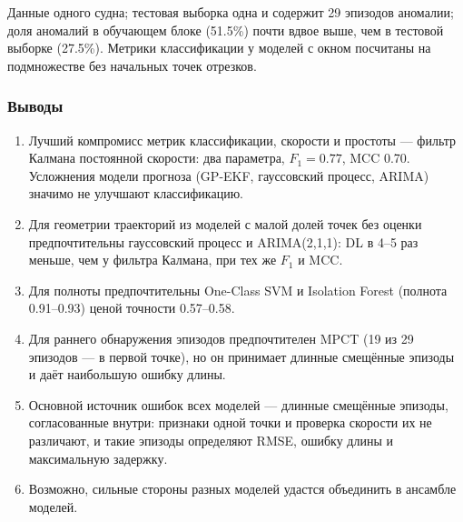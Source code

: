 \documentclass[a4paper,12pt]{report}
\begin{document}
Данные одного судна; тестовая выборка одна и содержит 29 эпизодов аномалии; доля аномалий в обучающем блоке (51.5\%) почти вдвое выше, чем в тестовой выборке (27.5\%). Метрики классификации у моделей с окном посчитаны на подмножестве без начальных точек отрезков.

\subsubsection{Выводы}

\begin{enumerate}
	\item Лучший компромисс метрик классификации, скорости и простоты --- фильтр Калмана постоянной скорости: два параметра, $F_1=0.77$, MCC 0.70. Усложнения модели прогноза (GP-EKF, гауссовский процесс, ARIMA) значимо не улучшают классификацию.
	\item Для геометрии траекторий из моделей с малой долей точек без оценки предпочтительны гауссовский процесс и ARIMA(2,1,1): DL в 4--5 раз меньше, чем у фильтра Калмана, при тех же $F_1$ и MCC.
	\item Для полноты предпочтительны One-Class SVM и Isolation Forest (полнота 0.91--0.93) ценой точности 0.57--0.58.
	\item Для раннего обнаружения эпизодов предпочтителен MPCT (19 из 29 эпизодов --- в первой точке), но он принимает длинные смещённые эпизоды и даёт наибольшую ошибку длины.
	\item Основной источник ошибок всех моделей --- длинные смещённые эпизоды, согласованные внутри: признаки одной точки и проверка скорости их не различают, и такие эпизоды определяют RMSE, ошибку длины и максимальную задержку.
	\item Возможно, сильные стороны разных моделей удастся объединить в ансамбле моделей.
\end{enumerate}
\end{document}
